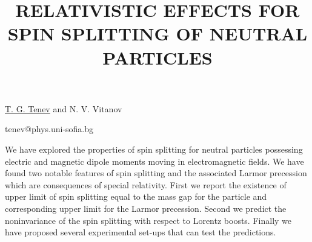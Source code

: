 \title{RELATIVISTIC EFFECTS FOR SPIN SPLITTING OF NEUTRAL PARTICLES}

\underline{T. G. Tenev} and N. V. Vitanov

{\normalsize{
\vspace{-4mm}\unisofia

\email tenev@phys.uni-sofia.bg}}

We have explored the properties of spin splitting for neutral particles possessing electric and
magnetic dipole moments moving in electromagnetic fields. We have found two notable features of spin
splitting and the associated Larmor precession which are consequences of special relativity. First we
report the existence of upper limit of spin splitting equal to the mass gap for the particle and
corresponding upper limit for the Larmor precession. Second we predict the noninvariance of the spin
splitting with respect to Lorentz boosts. Finally we have proposed several experimental set-ups that
can test the predictions.

\vspace{\baselineskip} 